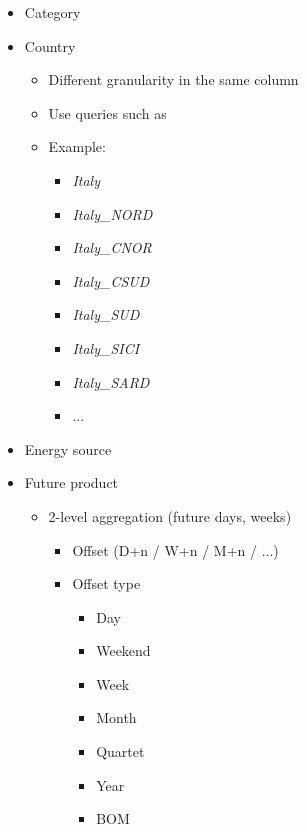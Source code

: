 \begin{itemize}
    \item Category
    
    \item Country
    \begin{itemize}
        \item Different granularity in the same column
        \item Use queries such as 
        \item Example:
        \begin{itemize}
            \item \textit{Italy}
            \item \textit{Italy\_NORD}
            \item \textit{Italy\_CNOR}
            \item \textit{Italy\_CSUD}
            \item \textit{Italy\_SUD}
            \item \textit{Italy\_SICI}
            \item \textit{Italy\_SARD}
            \item ...
        \end{itemize}
    \end{itemize}
    
    \item Energy source
    
    \item Future product
    \begin{itemize}
        \item 2-level aggregation (future days, weeks)
        \begin{itemize}
            \item Offset (D+n / W+n / M+n / ...)
            \item Offset type
            \begin{itemize}
                \item Day 
                \item Weekend 
                \item Week 
                \item Month 
                \item Quartet 
                \item Year 
                \item BOM
            \end{itemize}
        \end{itemize}
    \end{itemize}
    

\end{itemize}
